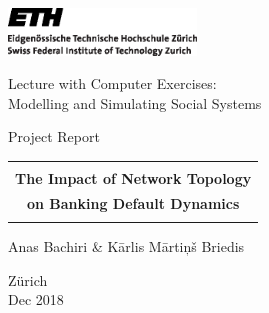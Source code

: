 
\thispagestyle{empty}

\begin{center}
\includegraphics[width=5cm]{img/ETHlogo.eps}

\bigskip


\bigskip


\bigskip


\LARGE{ 	Lecture with Computer Exercises:\\ }
\LARGE{ Modelling and Simulating Social Systems\\}

\bigskip

\bigskip

\small{Project Report}\\

\bigskip

\bigskip

\bigskip

\bigskip


\begin{tabular}{|c|}
\hline
\\
\textbf{\LARGE{The Impact of Network Topology}}\\
\textbf{\LARGE{on Banking Default Dynamics}}\\
\\
\hline
\end{tabular}
\bigskip

\bigskip

\bigskip

\LARGE{Anas Bachiri  \& K\={a}rlis M\={a}rti\c{n}\v{s} Briedis}



\bigskip

\bigskip

\bigskip

\bigskip

\bigskip

\bigskip

\bigskip

\bigskip

Z{\"u}rich\\
Dec 2018\\

\end{center}



